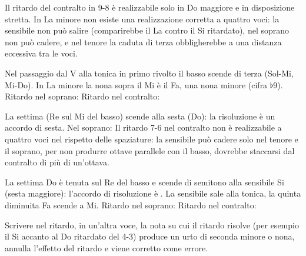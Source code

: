 \begin{esempio}
	\label{ex:ritardo_9_8_a}
	Il ritardo del contralto in 9-8 è realizzabile solo in Do maggiore e in disposizione stretta. In La minore non esiste una realizzazione corretta a quattro voci: la sensibile non può salire (comparirebbe il La contro il Si ritardato), nel soprano non può cadere, e nel tenore la caduta di terza obbligherebbe a una distanza eccessiva tra le voci.
\end{esempio}

\begin{esempio}[Ritardo 9-3]
	\label{ex:ritardo_9_3}
	Nel passaggio dal V alla tonica in primo rivolto il basso scende di terza (Sol-Mi, Mi-Do). In La minore la nona sopra il Mi è il Fa, una nona minore (cifra $\flat$9).
	Ritardo nel soprano:
	Ritardo nel contralto:
\end{esempio}

\begin{esempio}[Ritardo 7-6]
	\label{ex:ritardo_7_6}
	La settima (Re sul Mi del basso) scende alla sesta (Do): la risoluzione è un accordo di sesta. Nel soprano:
	Il ritardo 7-6 nel contralto non è realizzabile a quattro voci nel rispetto delle spaziature: la sensibile può cadere solo nel tenore e il soprano, per non produrre ottave parallele con il basso, dovrebbe staccarsi dal contralto di più di un'ottava.
\end{esempio}

\begin{esempio}
	\label{ex:ritardo_7_6d}
	La settima Do è tenuta sul Re del basso e scende di semitono alla sensibile Si (sesta maggiore): l'accordo di risoluzione è . La sensibile sale alla tonica, la quinta diminuita Fa scende a Mi. Ritardo nel soprano:
	Ritardo nel contralto:
\end{esempio}

\begin{errore}
	\label{err:ritardo_risoluzione}
	Scrivere nel ritardo, in un'altra voce, la nota su cui il ritardo risolve (per esempio il Si accanto al Do ritardato del 4-3) produce un urto di seconda minore o nona, annulla l'effetto del ritardo e viene corretto come errore.
\end{errore}

